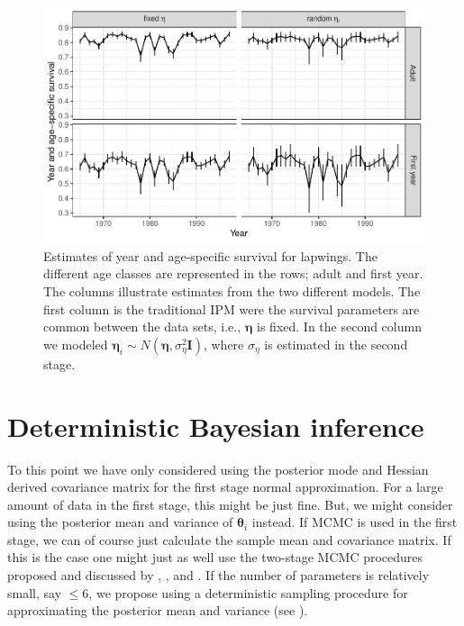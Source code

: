 \documentclass[12pt]{article}
\newcommand{\bt}{\boldsymbol{\theta}}
\newcommand{\bn}{\boldsymbol{\eta}}
\newcommand{\bI}{\mathbf{I}}
\begin{document}
\begin{figure}
\includegraphics[width=6.5in]{survival} 
\caption{\label{fig:surv}Estimates of year and age-specific survival for lapwings. The different age classes are represented in the rows; adult and first year. The columns illustrate estimates from the two different models. The first column is the traditional IPM were the survival parameters are common between the data sets, i.e., $\bn$ is fixed. In the second column we modeled $\bn_i \sim N(\bn, \sigma_{\eta}^2\bI)$, where $\sigma_{\eta}$ is estimated in the second stage.}
\end{figure}

\clearpage

\appendix

\section{Deterministic Bayesian inference} 
\label{sec:methodii}

To this point we have only considered using the posterior mode and Hessian derived covariance matrix for the first stage normal approximation. For a large amount of data in the first stage, this might be just fine. But, we might consider using the posterior mean and variance of $\bt_i$ instead. If MCMC is used in the first stage, we can of course just calculate the sample mean and covariance matrix. If this is the case one might just as well use the two-stage MCMC procedures proposed and discussed by \cite{lunn2013fully}, \cite{hooten2018prior}, and \cite{goudie2019joining}. If the number of parameters is relatively small, say $\le 6$, we propose using a deterministic sampling procedure for approximating the posterior mean and variance (see \citealt{johnson2011bayesian}). 
\end{document}
